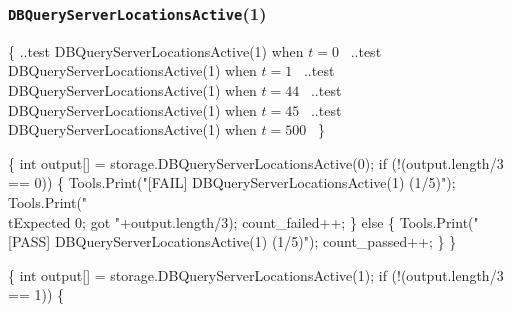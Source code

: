 \documentclass{article}
\def\nwendcode{\endtrivlist \endgroup}
\let\nwdocspar=\par
\begin{document}
\subsubsection{{\tt{}DBQueryServerLocationsActive}(1)}
\nwenddocs{}\endmoddef{}
\{
  \LA{}..test \code{}DBQueryServerLocationsActive\edoc{}(1) when $t=0$~{\nwtagstyle{}}\RA{}
  \LA{}..test \code{}DBQueryServerLocationsActive\edoc{}(1) when $t=1$~{\nwtagstyle{}}\RA{}
  \LA{}..test \code{}DBQueryServerLocationsActive\edoc{}(1) when $t=44$~{\nwtagstyle{}}\RA{}
  \LA{}..test \code{}DBQueryServerLocationsActive\edoc{}(1) when $t=45$~{\nwtagstyle{}}\RA{}
  \LA{}..test \code{}DBQueryServerLocationsActive\edoc{}(1) when $t=500$~{\nwtagstyle{}}\RA{}
\}
\nwendcode{}\nwdocspar
\nwenddocs{}\endmoddef{}
\{
  int output[] = storage.DBQueryServerLocationsActive(0);
  if (!(output.length/3 == 0)) \{
    Tools.Print("[FAIL] DBQueryServerLocationsActive(1) (1/5)");
    Tools.Print("\\tExpected 0; got "+output.length/3);
    count_failed++;
  \} else \{
    Tools.Print("[PASS] DBQueryServerLocationsActive(1) (1/5)");
    count_passed++;
  \}
\}
\nwendcode{}\nwdocspar
\nwenddocs{}\endmoddef{}
\{
  int output[] = storage.DBQueryServerLocationsActive(1);
  if (!(output.length/3 == 1)) \{
\end{document}
